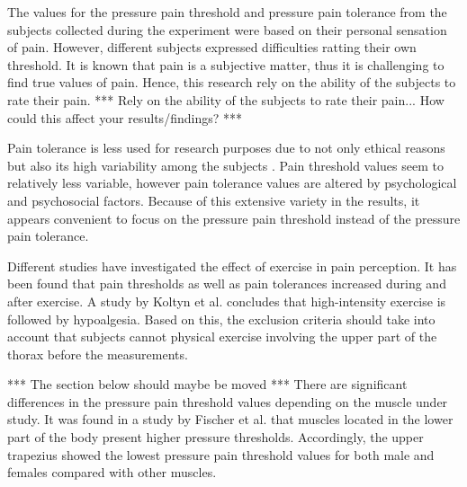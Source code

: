 
The values for the pressure pain threshold and pressure pain tolerance from the subjects collected during the experiment were based on their personal sensation of pain. However, different subjects expressed difficulties ratting their own threshold. It is known that pain is a subjective matter, thus it is challenging to find true values of pain. Hence, this research rely on the ability of the subjects to rate their pain.
*** Rely on the ability of the subjects to rate their pain... How could this affect your results/findings?  ***

Pain tolerance is less used for research purposes due to not only  ethical reasons but also its high variability among the subjects \cite{Yarnitsky2006}. Pain threshold values seem to relatively less variable, however pain tolerance values are altered by psychological and psychosocial factors. Because of this extensive variety in the results, it appears convenient to focus on the pressure pain threshold instead of the pressure pain tolerance. 

Different studies have investigated the effect of exercise in pain perception. It has been found that pain thresholds as well as pain tolerances increased during and after exercise.  A study by Koltyn et al. \cite{Koltyn2002} concludes that high-intensity exercise is followed by hypoalgesia. Based on this, the exclusion criteria should take into account that subjects cannot physical exercise involving the upper  part of the thorax before the measurements.

*** The section below should maybe be moved ***
There are significant differences in the pressure pain threshold values depending on the  muscle under study. It was found in a study by Fischer et al. \cite{Fischer1987} that muscles located in the lower part of the body present  higher pressure thresholds. Accordingly, the upper trapezius showed the lowest pressure pain threshold values for both male and females compared with other muscles.

